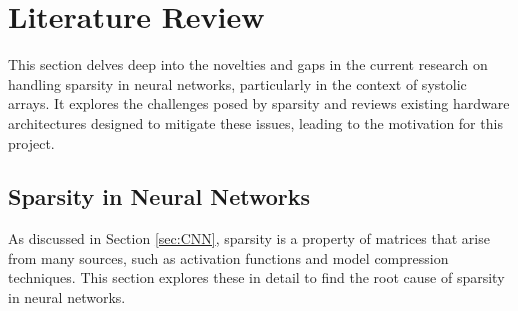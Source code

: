 \documentclass[12pt, a4paper, ukenglish]{article}
\begin{document}
    




\section{Literature Review} \label{sec: literature review}


    This section delves deep into the novelties and gaps in the current research on handling sparsity in neural networks, particularly in the context of systolic arrays. It explores the challenges posed by sparsity and reviews existing hardware architectures designed to mitigate these issues, leading to the motivation for this project.   


    \subsection{Sparsity in Neural Networks} \label{sec: sparsity in nn}
    As discussed in Section \ref{sec:CNN}, sparsity is a property of matrices that arise from many sources, such as activation functions and model compression techniques. This section explores these in detail to find the root cause of sparsity in neural networks. 
\end{document}
